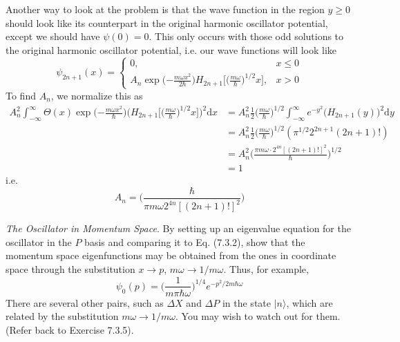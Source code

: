 \documentclass[../principles-of-quantum-mechanics.tex]{subfiles}
\begin{document}
\begin{questions}
\begin{solution}
			Another way to look at the problem is that the wave function in the region $y \geq 0$ should look like its counterpart in the original harmonic oscillator potential, except we should have $\psi(0) = 0$. This only occurs with those odd solutions to the original harmonic oscillator potential, i.e. our wave functions will look like
			$$\psi_{2n + 1}(x) = \begin{cases}0, &x \leq 0 \\
				A_{n}\exp\Big({-\frac{m\omega x^2}{2\hbar}}\Big)H_{2n+1}\Big[\Big(\frac{m\omega}{\hbar}\Big)^{1/2}x\Big], &x > 0
			\end{cases}$$
			To find $A_n$, we normalize this as
			\begin{align*}
				A_n^2\int_{-\infty}^{\infty}\Theta(x)\exp\big({-\tfrac{m\omega x^2}{\hbar}}\big)\big(H_{2n+1}\big[\big(\tfrac{m\omega}{\hbar}\big)^{1/2}x\big]\big)^2\mathrm{d}x &= A_n^2\tfrac{1}{2}\big(\tfrac{m\omega}{\hbar}\big)^{1/2}\int_{-\infty}^{\infty}e^{-y^2}\big(H_{2n+1}(y)\big)^2\mathrm{d}y \\
				&= A_n^2\tfrac{1}{2}\big(\tfrac{m\omega}{\hbar}\big)^{1/2}(\pi^{1/2}2^{2n+1}(2n+1)!) \\
				&= A_n^2\big(\tfrac{\pi m\omega \cdot 2^{4n}[(2n + 1)!]^2}{\hbar}\big)^{1/2} \\
				&= 1
			\end{align*}
			i.e.
			$$A_n = \Big(\frac{\hbar}{\pi m \omega 2^{4n}[(2n+1)!]^2}\Big)$$
		\end{solution}
	
		\question \textit{The Oscillator in Momentum Space}. By setting up an eigenvalue equation for the oscillator in the $P$ basis and comparing it to Eq. (7.3.2), show that the momentum space eigenfunctions may be obtained from the ones in coordinate space through the substitution $x \to p$, $m\omega \to 1/m\omega$. Thus, for example,
		$$\psi_0(p) = \Big(\frac{1}{m\pi\hbar \omega}\Big)^{1/4}e^{-p^2/2m\hbar \omega}$$
		There are several other pairs, such as $\Delta X$ and $\Delta P$ in the state $|n\rangle$, which are related by the substitution $m\omega \to 1/m\omega$. You may wish to watch out for them. (Refer back to Exercise 7.3.5).
		

\end{questions}
\end{document}
